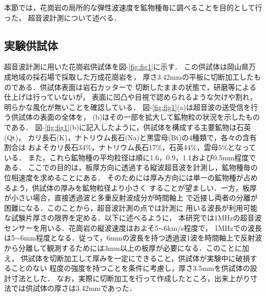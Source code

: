 ﻿%
本節では，花崗岩の局所的な弾性波速度を鉱物種毎に調べることを目的として行った，
超音波計測について述べる．
\subsection{実験供試体}
超音波計測に用いた花崗岩供試体を図-\ref{fig:fig1}に示す．
この供試体は岡山県万成地域の採石場で採取した万成花崗岩を，
厚さ3.42mmの平板に切断加工したものである．供試体表面は岩石カッターで
切断したままの状態で，研磨等による仕上げは行っていないが，
表面に凹凸や目視で認められるような欠けや割れ，明らかな風化が無いことを確認している．
図-\ref{fig:fig1}(a)は超音波の送受信を行う供試体の表面の全体を，
(b)はその一部を拡大して鉱物粒の状況を示したものである．
図-\ref{fig:fig1}(b)に記入したように，供試体を構成する主要鉱物は石英(Qt)，
カリ長石(K)，ナトリウム長石(Na)と黒雲母(Bt)の4種類で，各々の含有割合は
およそカリ長石34\%，ナトリウム長石17\%，石英44\%，雲母5\%となっている．
また，これら鉱物種の平均粒径は順に1.6，0.9，1.1および0.5mm程度である．
ここでの目的は，板厚方向に透過する縦波超音波を計測し，鉱物種毎の位相速度を求めることにある．
そのためには厚み方向には単一の鉱物種が占めるよう，供試体の厚みを鉱物粒径より小さく
することが望ましい．一方，板厚が小さい場合，直接透過波と多重反射波成分が時間軸上
で近接し両者の分離が困難になる．このことから，超音波計測の点では計測に
用いる波長が利用可能な試験片厚さの限界を定める．以下に述べるように，
本研究では1MHzの超音波センサーを用いる．花崗岩の縦波速度はおよそ5$\sim$6km/s程度で，
1MHzでの波長は5$\sim$6mm程度となる．従って，6mmの波長を持つ透過波1波を時間軸上で反射波
から分離して観測するためには3mm以上の板厚が必要になる．このことに加え，
供試体を切断加工して厚みを一定にできること，供試体が実験中に破損することのない
程度の強度を持つことを条件に考慮し，厚さ3.5mmを供試体の設計寸法とした．
なお，実際に切断加工を行って作成したところ，出来上がり寸法では供試体の厚さは3.42mmであった．
